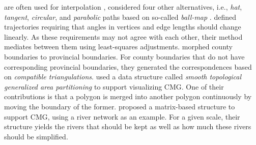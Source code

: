 are often used for interpolation
\parencite[e.g.,][]{Cecconi2003,Deng2015},
\textcite{Whited2011BallMorph} considered four other alternatives, 
i.e., \emph{hat}, \emph{tangent}, \emph{circular}, 
and \emph{parabolic} paths
based on so-called \emph{ball-map}
\parencite{Chazal2010BallMap}.
\textcite{Peng2013LSA} defined trajectories requiring that
angles in vertices and edge lengths should change linearly.
As these requirements may not agree with each other,
their method mediates between them using 
least-squares adjustments.
\textcite{Peng2016Admin} morphed county boundaries
to provincial boundaries.
For county boundaries that do not have corresponding 
provincial boundaries, they generated the correspondences based 
on \emph{compatible triangulations}.
\Textcite{vanOosterom2014tGAP} used
a data structure called
\emph{smooth topological generalized area partitioning}
to support visualizing CMG.
One of their contributions is that
a polygon is merged into another polygon continuously
by moving the boundary of the former.
\textcite{Huang2017Matrix} proposed a matrix-based structure 
to support CMG,
using a river network as an example.
For a given scale, 
their structure yields the rivers that should be kept 
as well as how much these rivers should be simplified.



